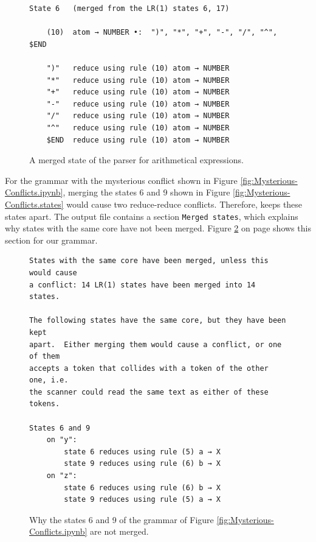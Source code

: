\begin{figure}[!ht]
\centering
\begin{verbatim}
State 6   (merged from the LR(1) states 6, 17)

    (10)  atom → NUMBER •:  ")", "*", "+", "-", "/", "^", $END

    ")"   reduce using rule (10) atom → NUMBER
    "*"   reduce using rule (10) atom → NUMBER
    "+"   reduce using rule (10) atom → NUMBER
    "-"   reduce using rule (10) atom → NUMBER
    "/"   reduce using rule (10) atom → NUMBER
    "^"   reduce using rule (10) atom → NUMBER
    $END  reduce using rule (10) atom → NUMBER
\end{verbatim}
\vspace*{-0.3cm}
\caption{A merged state of the parser for arithmetical expressions.}
\label{fig:Merging-States.state6}
\end{figure}

For the grammar with the mysterious conflict shown in Figure \ref{fig:Mysterious-Conflicts.ipynb}, merging the
states 6 and 9 shown in Figure \ref{fig:Mysterious-Conflicts.states} would cause two reduce-reduce conflicts.
Therefore,  keeps these states apart.  The output file contains a section
\texttt{Merged states}, which explains why states with the same core have not been merged.
Figure \ref{fig:Merging-States.mysterious} on page \pageref{fig:Merging-States.mysterious} shows this section for
our grammar.

\begin{figure}[!ht]
\centering
\begin{verbatim}
States with the same core have been merged, unless this would cause
a conflict: 14 LR(1) states have been merged into 14 states.

The following states have the same core, but they have been kept
apart.  Either merging them would cause a conflict, or one of them
accepts a token that collides with a token of the other one, i.e.
the scanner could read the same text as either of these tokens.

States 6 and 9
    on "y":
        state 6 reduces using rule (5) a → X
        state 9 reduces using rule (6) b → X
    on "z":
        state 6 reduces using rule (6) b → X
        state 9 reduces using rule (5) a → X
\end{verbatim}
\vspace*{-0.3cm}
\caption{Why the states 6 and 9 of the grammar of Figure \ref{fig:Mysterious-Conflicts.ipynb} are not merged.}
\label{fig:Merging-States.mysterious}
\end{figure}


